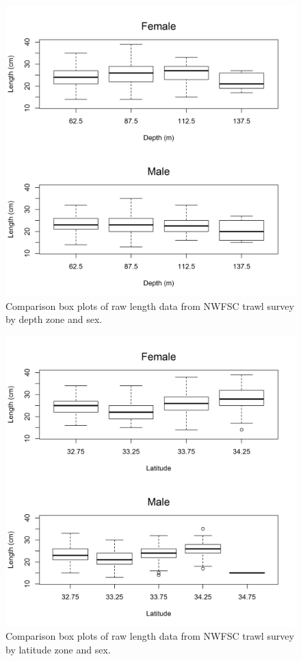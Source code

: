 \documentclass[12pt,]{article}
\begin{document}
\FloatBarrier

\begin{figure}[htbp]
\centering
\includegraphics{Figures/NWFSCtrawl_lengthdepth.png}
\caption{Comparison box plots of raw length data from NWFSC trawl survey
by depth zone and sex. \label{fig:Fleet8_NWFSCtrawl_lengthdepth}}
\end{figure}

\begin{figure}[htbp]
\centering
\includegraphics{Figures/NWFSCtrawl_lengthlat.png}
\caption{Comparison box plots of raw length data from NWFSC trawl survey
by latitude zone and sex. \label{fig:Fleet8_NWFSCtrawl_lengthlat}}
\end{figure}
\end{document}
